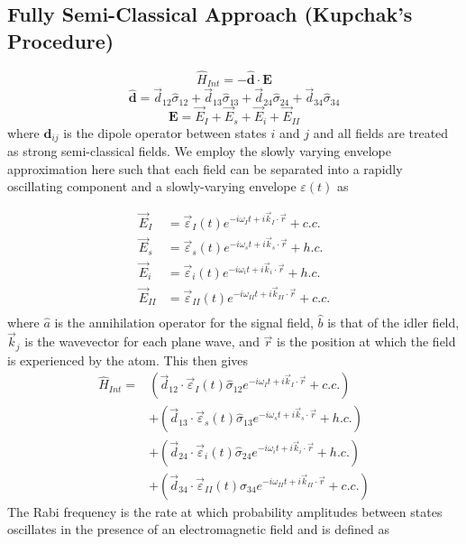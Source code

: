 \documentclass[aps,pra,showpacs,amsmath,amssymb,nofootinbib,longbibliography,superscriptaddress
]{revtex4-1}
\theoremstyle{definition}
\theoremstyle{remark}
\newcommand{\0}{\hat{0}}
\begin{document}
\subsection{Fully Semi-Classical Approach (Kupchak's Procedure)}


\begin{equation}
    \hat{H}_{Int} = - \hat{\mathbf{d}} \cdot \mathbf{E}
\end{equation}
\begin{equation}
    \hat{\mathbf{d}} = \vec{d}_{12} \hat{\sigma}_{12} + \vec{d}_{13} \hat{\sigma}_{13} + \vec{d}_{24} \hat{\sigma}_{24} + \vec{d}_{34} \hat{\sigma}_{34}
\end{equation}
\begin{equation}
    \mathbf{E} = \vec{E}_{I} + \vec{E}_{s} + \vec{E}_{i} + \vec{E}_{II}
\end{equation}
where $\mathbf{d}_{ij}$ is the dipole operator between states $i$ and $j$ and all fields are treated as strong semi-classical fields. We employ the slowly varying envelope approximation here such that each field can be separated into a rapidly oscillating component and a slowly-varying envelope $\varepsilon(t)$ as

\begin{align}
    \vec{E}_{I} &= \vec{\varepsilon}_I(t) e^{-i \omega_I t + i \vec{k}_I \cdot \vec{r}} + c.c.\\
    \vec{E}_{s} &= \vec{\varepsilon}_{s}(t) e^{-i \omega_s t + i \vec{k}_{s} \cdot \vec{r}} + h.c.\\
    \vec{E}_{i} &= \vec{\varepsilon}_{i}(t) e^{-i \omega_{i} t + i \vec{k}_{i} \cdot \vec{r}} + h.c.\\
    \vec{E}_{II} &= \vec{\varepsilon}_{II}(t) e^{-i \omega_{II} t + i \vec{k}_{II} \cdot \vec{r}} + c.c.\\
\end{align}
where $\hat{a}$ is the annihilation operator for the signal field, $\hat{b}$ is that of the idler field, $\vec{k}_j$ is the wavevector for each plane wave, and $\vec{r}$ is the position at which the field is experienced by the atom. This then gives
\begin{align}
    \hat{H}_{Int} = &\left(\vec{d}_{12} \cdot \vec{\varepsilon}_I(t) \hat{\sigma}_{12} e^{-i \omega_I t + i \vec{k}_I \cdot \vec{r}} + c.c.\right)\nonumber \\
    &+ \left(\vec{d}_{13} \cdot \vec{\varepsilon}_{s}(t) \hat{\sigma}_{13} e^{-i \omega_s t + i \vec{k}_{s} \cdot \vec{r}} + h.c.\right)\nonumber \\
    &+ \left(\vec{d}_{24} \cdot \vec{\varepsilon}_{i}(t) \hat{\sigma}_{24} e^{-i \omega_{i} t + i \vec{k}_{i} \cdot \vec{r}} + h.c.\right)\nonumber \\
    &+ \left(\vec{d}_{34} \cdot \vec{\varepsilon}_{II}(t) \hat{\sigma}_{34} e^{-i \omega_{II} t + i \vec{k}_{II} \cdot \vec{r}} + c.c.\right)
\end{align}
The Rabi frequency is the rate at which probability amplitudes between states oscillates in the presence of an electromagnetic field \cite{TODO} and is defined as
\end{document}

